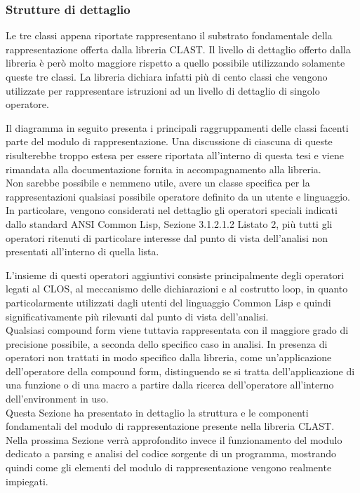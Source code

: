 \subsubsection{Strutture di dettaglio}

Le tre classi appena riportate rappresentano il substrato fondamentale della
rappresentazione offerta dalla libreria CLAST. Il livello di dettaglio offerto
dalla libreria è però molto maggiore rispetto a quello possibile utilizzando
solamente queste tre classi. La libreria dichiara infatti più di cento classi
che vengono utilizzate per rappresentare istruzioni ad un livello di dettaglio
di singolo operatore.

Il diagramma in seguito presenta i principali raggruppamenti delle classi
facenti parte del modulo di rappresentazione. Una discussione di ciascuna di
queste risulterebbe troppo estesa per essere riportata all’interno di questa
tesi e viene rimandata alla documentazione fornita in accompagnamento alla
libreria.\\

Non sarebbe possibile e nemmeno utile, avere un classe specifica per la
rappresentazioni qualsiasi possibile operatore definito da un utente e
linguaggio. In particolare, vengono considerati nel dettaglio gli operatori
speciali indicati dallo standard ANSI Common Lisp, Sezione 3.1.2.1.2 Listato
2, più tutti gli operatori ritenuti di particolare interesse dal punto di
vista dell’analisi non presentati all’interno di quella lista.

L'insieme di questi operatori aggiuntivi consiste principalmente degli
operatori legati al CLOS, al meccanismo delle dichiarazioni e al costrutto
loop, in quanto particolarmente utilizzati dagli utenti del linguaggio Common
Lisp e quindi significativamente più rilevanti dal punto di vista
dell’analisi.\\

Qualsiasi compound form viene tuttavia rappresentata con il maggiore grado di
precisione possibile, a seconda dello specifico caso in analisi. In presenza
di operatori non trattati in modo specifico dalla libreria, come
un'applicazione dell'operatore della compound form, distinguendo se si tratta
dell’applicazione di una funzione o di una macro a partire dalla ricerca
dell'operatore all'interno dell'environment in uso.\\

Questa Sezione ha presentato in dettaglio la struttura e le componenti
fondamentali del modulo di rappresentazione presente nella libreria CLAST.
Nella prossima Sezione verrà approfondito invece il funzionamento del modulo
dedicato a parsing e analisi del codice sorgente di un programma, mostrando
quindi come gli elementi del modulo di rappresentazione vengono realmente
impiegati.
